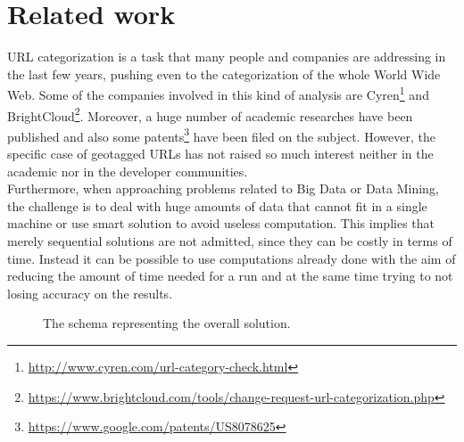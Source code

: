 \documentclass{sig-alternate-05-2015}
\begin{document}
\section{Related work}
URL categorization is a task that many people and companies are addressing in the last few years, pushing even to the categorization of the whole World Wide Web. Some of the companies involved in this kind of analysis are Cyren\footnote{\url{http://www.cyren.com/url-category-check.html}} and BrightCloud\footnote{\url{https://www.brightcloud.com/tools/change-request-url-categorization.php}}. Moreover, a huge number of academic researches have been published and also some patents\footnote{\url{https://www.google.com/patents/US8078625}} have been filed on the subject. However, the specific case of geotagged URLs has not raised so much interest neither in the academic nor in the developer communities.\\
Furthermore, when approaching problems related to Big Data or Data Mining, the challenge is to deal with huge amounts of data that cannot fit in a single machine or use smart solution to avoid useless computation. This implies that merely sequential solutions are not admitted, since they can be costly in terms of time. Instead it can be possible to use computations already done with the aim of reducing the amount of time needed for a run and at the same time trying to not losing accuracy on the results.
\begin{figure}[t]
  \caption{The schema representing the overall solution.}
  \label{solution}
\end{figure}
\end{document}
